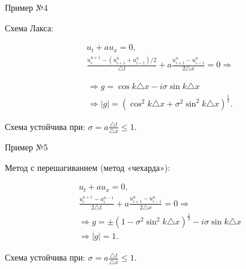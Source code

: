 \documentclass[10pt,xcolor=pst,aspectratio=169]{beamer}
\begin{document}
\begin{frame}{Пример №4}

	\transdissolve[duration=0.1]
	\justifying
	\large

	Схема Лакса:

	\[
		\begin{split}
			&u_{t} + a u_{x} = 0 , \\
			&\frac{u^{n + 1}_{i} - (u^{n}_{i+1} + u^{n}_{i-1})/2}{\triangle t} + a \frac{u^{n}_{i + 1} - u^{n}_{i - 1}}{2 \triangle x} = 0 \Rightarrow
		\end{split}
	\]

	\pause

	\[
		\begin{split}
			& \Rightarrow g = \cos k \triangle x - i \sigma \sin k \triangle x \\
			& \Rightarrow |g| = \left( \cos^{2} k \triangle x + \sigma^{2} \sin^{2} k \triangle x \right)^{\frac{1}{2}} .
		\end{split}
	\]

    Схема устойчива при: $\sigma = a \frac{\triangle t}{\triangle x} \leq 1$.\\

\end{frame}

\begin{frame}{Пример №5}

	\transdissolve[duration=0.1]
	\justifying
	\large

	Метод с перешагиванием (метод «чехарда»):

	\[
		\begin{split}
			&u_{t} + a u_{x} = 0 , \\
			&\frac{u^{n + 1}_{i} - u^{n - 1}_{i}}{2 \triangle t} + a \frac{u^{n}_{i + 1} - u^{n}_{i - 1}}{2 \triangle x} = 0 \Rightarrow \\
			& \Rightarrow g = \pm (1 - \sigma^{2} \sin^{2} k \triangle x)^{\frac{1}{2}} - i \sigma \sin k \triangle x \\
			& \Rightarrow |g| = 1 .
		\end{split}
	\]

    Схема устойчива при: $\sigma = a \frac{\triangle t}{\triangle x} \leq 1$.\\

\end{frame}
\end{document}
